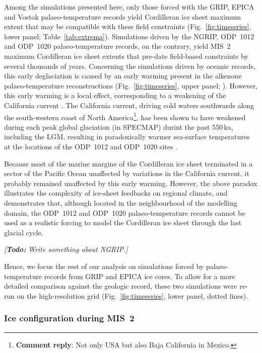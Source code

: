 \documentclass[tc, manuscript]{copernicus}
\newcommand{\renote}[1]{\footnote{\textbf{Comment reply}: #1}}
\newcommand{\todo}[1]{\emph{[\textbf{Todo:} #1]}}
\begin{document}
Among the simulations presented here, only those forced with the GRIP, EPICA
and Vostok palaeo-temperature records yield Cordilleran ice sheet maximum
extent that may be compatible with these field constraints
(Fig.~\ref{fig:timeseries}, lower panel; Table~\ref{tab:extrema}).
Simulations driven by the NGRIP, ODP~1012 and ODP~1020
palaeo-temperature records, on the contrary, yield MIS~2 maximum Cordilleran
ice sheet extents that pre-date field-based constraints by several thousands of
years. Concerning the simulations driven by oceanic records, this early
deglaciation is caused by an early warming present in the alkenone
palaeo-temperature reconstructions (Fig.~\ref{fig:timeseries}, upper panel;
\citealp[Fig.~3]{Herbert.etal.2001}). However, this
early warming is a local effect, corresponding to a weakening of the California
current \citep{Herbert.etal.2001}. The California current, driving cold
waters southwards along the south-western coast of North America\renote{
    Not only USA but also Baja California in Mexico.},
has been shown to have weakened during each peak global glaciation (in SPECMAP)
durint the past 550\,ka, including the LGM, resulting in paradoxically warmer
sea-surface temperatures at the locations of the ODP~1012 and ODP~1020 sites
\citep{Herbert.etal.2001}.

Because most of the marine margine of the Cordilleran ice sheet terminated in a
sector of the Pacific Ocean unaffected by variations in the California current,
it probably remained unaffected by this early warming. However, the above paradox
illustrates the complexity of ice-sheet feedbacks on regional climate, and
demonstrates that, although located in the neighbourhood of the modelling
domain, the ODP~1012 and ODP~1020 palaeo-temperature records cannot be
used as a realistic forcing to model the Cordilleran ice sheet
through the last glacial cycle.

\todo{Write something about NGRIP.}

Hence, we focus the rest of our analysis on simulations forced by
palaeo-temperature records from GRIP and EPICA ice cores. To allow for a more
detailed comparison against the geologic record, these two simulations were
re-run on the high-resolution grid (Fig.~\ref{fig:timeseries}, lower panel,
dotted lines).

\subsubsection{Ice configuration during MIS~2}
\end{document}
